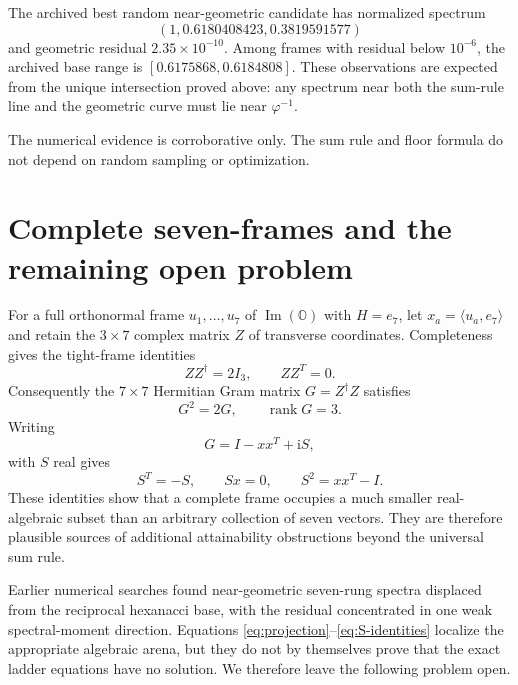 \documentclass[11pt]{article}
\newcommand{\Oa}{\mathbb{O}}
\newcommand{\ii}{\mathrm{i}}
\newcommand{\rank}{\operatorname{rank}}
\newcommand{\ip}[2]{\langle #1,#2\rangle}
\theoremstyle{remark}
\begin{document}
The archived best random near-geometric candidate has normalized spectrum
\[
 (1,0.6180408423,0.3819591577)
\]
and geometric residual $2.35\times10^{-10}$.  Among frames with residual below $10^{-6}$, the archived base range is $[0.6175868,0.6184808]$.  These observations are expected from the unique intersection proved above: any spectrum near both the sum-rule line and the geometric curve must lie near $\varphi^{-1}$.

The numerical evidence is corroborative only.  The sum rule and floor formula do not depend on random sampling or optimization.

\section{Complete seven-frames and the remaining open problem}

For a full orthonormal frame $u_1,\ldots,u_7$ of $\operatorname{Im}(\Oa)$ with $H=e_7$, let $x_a=\ip{u_a}{e_7}$ and retain the $3\times7$ complex matrix $Z$ of transverse coordinates.  Completeness gives the tight-frame identities
\begin{equation}
 ZZ^\dagger=2I_3,
 \qquad
 ZZ^T=0.
 \label{eq:tight}
\end{equation}
Consequently the $7\times7$ Hermitian Gram matrix $G=Z^\dagger Z$ satisfies
\begin{equation}
 G^2=2G,
 \qquad
 \rank G=3.
 \label{eq:projection}
\end{equation}
Writing
\begin{equation}
 G=I-xx^T+\ii S,
 \end{equation}
with $S$ real gives
\begin{equation}
 S^T=-S,
 \qquad Sx=0,
 \qquad S^2=xx^T-I.
 \label{eq:S-identities}
\end{equation}
These identities show that a complete frame occupies a much smaller real-algebraic subset than an arbitrary collection of seven vectors.  They are therefore plausible sources of additional attainability obstructions beyond the universal sum rule.

Earlier numerical searches found near-geometric seven-rung spectra displaced from the reciprocal hexanacci base, with the residual concentrated in one weak spectral-moment direction.  Equations \eqref{eq:projection}--\eqref{eq:S-identities} localize the appropriate algebraic arena, but they do not by themselves prove that the exact ladder equations have no solution.  We therefore leave the following problem open.
\end{document}

